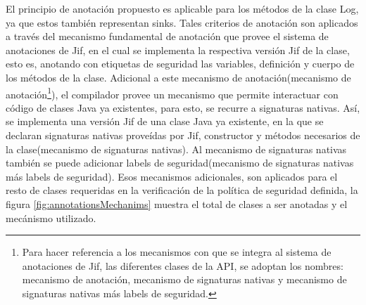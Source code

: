 El principio de anotación propuesto es aplicable para los métodos de la clase
Log, ya que estos también representan sinks.\newline 
Tales criterios de anotación son aplicados a través del mecanismo fundamental de
anotación que provee el sistema de anotaciones de Jif, en el cual se implementa
la respectiva versión Jif de la clase, esto es, anotando con etiquetas de
seguridad las variables, definición y cuerpo de los métodos de la clase.
Adicional a este mecanismo de anotación(mecanismo de
anotación\footnote{Para hacer referencia a los mecanismos con que se integra al
sistema de anotaciones de Jif, las diferentes clases de la API, se adoptan los
nombres: mecanismo de anotación, mecanismo de signaturas nativas y mecanismo de
signaturas nativas más labels de seguridad.}), el compilador provee un mecanismo
que permite interactuar con código de clases Java ya
existentes\cite{annotations-Jif}, para esto, se recurre a signaturas nativas.
Así, se implementa una versión Jif de una clase Java ya existente, en la que se
declaran signaturas nativas proveídas por Jif, constructor y métodos necesarios
de la clase(mecanismo de signaturas nativas).
Al mecanismo de signaturas nativas también se puede  adicionar labels de
seguridad(mecanismo de signaturas nativas más labels de seguridad).\newline 
Esos mecanismos adicionales, son aplicados para el resto de clases requeridas en
la verificación de la política de seguridad definida, la figura
\ref{fig:annotationsMechanims} muestra el total de clases a ser anotadas y el
mecánismo utilizado.

